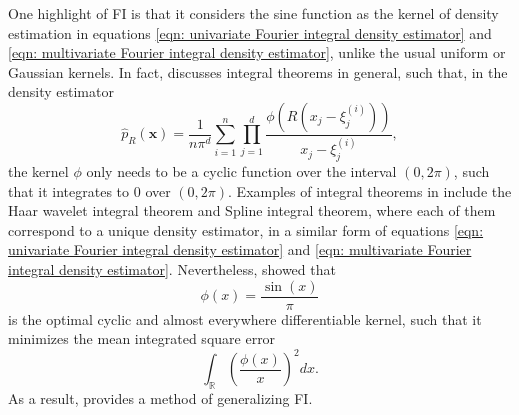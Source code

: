 \documentclass[%
 reprint,
 amsmath,amssymb,
 aps,
]{revtex4-2}
\def\R{\mathbb{R}}
\begin{document}
One highlight of FI is that it considers the sine function as the kernel of density estimation in equations \eqref{eqn: univariate Fourier integral density estimator} and \eqref{eqn: multivariate Fourier integral density estimator}, unlike the usual uniform or Gaussian kernels. In fact, \cite{ho2021integral} discusses integral theorems in general, such that, in the density estimator
\begin{equation} \label{eqn: general integral theorem estimator}
    \hat{p}_R(\mathbf{x}) = \frac{1}{n\pi^d}\sum_{i = 1}^n \prod_{j = 1}^d \frac{\phi(R(x_j - \xi_j^{(i)}))}{x_j - \xi_j^{(i)}},
\end{equation}
the kernel $\phi$ only needs to be a cyclic function over the interval $(0, 2\pi)$, such that it integrates to 0 over $(0, 2\pi)$. Examples of integral theorems in \cite{ho2021integral} include the Haar wavelet integral theorem and Spline integral theorem, where each of them correspond to a unique density estimator, in a similar form of equations \eqref{eqn: univariate Fourier integral density estimator} and \eqref{eqn: multivariate Fourier integral density estimator}. Nevertheless, \cite{ho2021integral} showed that 
\begin{equation} \label{eqn: optimal cyclic kernel (sine)}
    \phi(x) = \frac{\sin(x)}{\pi}
\end{equation}
is the optimal cyclic and almost everywhere differentiable kernel, such that it minimizes the mean integrated square error
\begin{equation} \label{eqn: mean integrated square error}
    \int_\R \left(\frac{\phi(x)}{x} \right)^2dx.
\end{equation}
As a result, \cite{ho2021integral} provides a method of generalizing FI.
\end{document}
